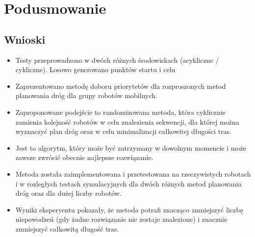 \section{Podusmowanie}
\subsection{Wnioski}
\begin{itemize}
	\item Testy przeprowadzono w dwóch różnych środowiskach (acykliczne / cykliczne). Losowo generowano punktów startu i celu
	\item Zaprezentowano metodę doboru priorytetów dla rozproszonych metod planowania dróg dla grupy robotów mobilnych.
	\item Zaproponowane podejście to randomizowana metoda, która cyklicznie zamienia kolejność robotów w celu znalezienia sekwencji, dla której można wyznaczyć plan dróg oraz w celu minimalizacji całkowitej długości tras.
	\item Jest to algorytm, który może być zatrzymany w dowolnym momencie i może zawsze zwrócić obecnie najlepsze rozwiązanie.
	\item Metoda została zaimplementowana i przetestowana na rzeczywistych robotach i w rozległych testach symulacyjnych dla dwóch różnych metod planowania dróg oraz dla dużej liczby robotów.
	\item Wyniki eksperyentu pokazały, że metoda potrafi znacząco zmniejszyć liczbę niepowodzeń (gdy żadne rozwiązanie nie zostaje znalezione) i znacznie zmniejszyć całkowitą długość tras.
\end{itemize}
